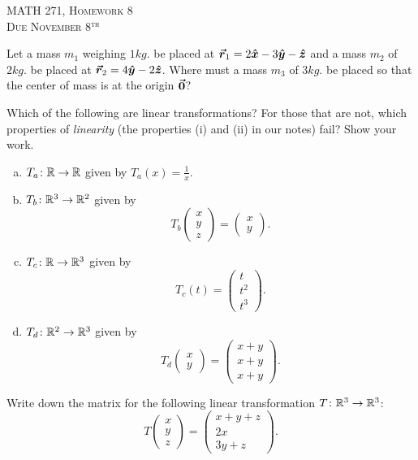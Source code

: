 \documentclass[12pt]{article} %
\begin{document}
\begin{center}
   \textsc{\large MATH 271, Homework 8}\\
   \textsc{Due November 8$^\textrm{th}$}
\end{center}
\vspace{.5cm}

\begin{problem}
Let a mass $m_1$ weighing $1kg.$ be placed at $\boldsymbol{\vec{r}}_1=2\boldsymbol{\hat{x}} -3 \boldsymbol{\hat{y}} -\boldsymbol{\hat{z}}$ and a mass $m_2$ of $2kg.$ be placed at $\boldsymbol{\vec{r}}_2 = 4\boldsymbol{\hat{y}} -2\boldsymbol{\hat{z}}$.  Where must a mass $m_3$ of $3kg.$ be placed so that the center of mass is at the origin $\boldsymbol{\vec{0}}$?
\end{problem}

\begin{problem}
Which of the following are linear transformations? For those that are not, which properties of \emph{linearity} (the properties (i) and (ii) in our notes) fail? Show your work. 
\begin{enumerate}[(a)]
    \item $T_a \colon \mathbb{R} \to \mathbb{R}$ given by $T_a(x)=\frac{1}{x}$.
    \item $T_b \colon \mathbb{R}^3 \to \mathbb{R}^2$ given by
    \[
    T_b \begin{pmatrix} x\\ y\\ z \end{pmatrix}
    = \begin{pmatrix} x\\ y \end{pmatrix}.
    \]
    \item $T_c \colon \mathbb{R} \to \mathbb{R}^3$ given by
    \[
    T_c(t)=\begin{pmatrix} t\\ t^2\\ t^3 \end{pmatrix}.
    \]
    \item $T_d \colon \mathbb{R}^2 \to \mathbb{R}^3$ given by
    \[
    T_d \begin{pmatrix} x\\ y \end{pmatrix}
    = \begin{pmatrix} x+y\\ x+y\\ x+y \end{pmatrix}.
    \]
\end{enumerate}
\end{problem}

\begin{problem}
Write down the matrix for the following linear transformation $T\colon \mathbb{R}^3 \to \mathbb{R}^3$:
\[
T\begin{pmatrix} x\\ y\\ z \end{pmatrix}
= \begin{pmatrix} x+y+z\\ 2x\\ 3y + z \end{pmatrix}.
\]
\end{problem}
\end{document}
